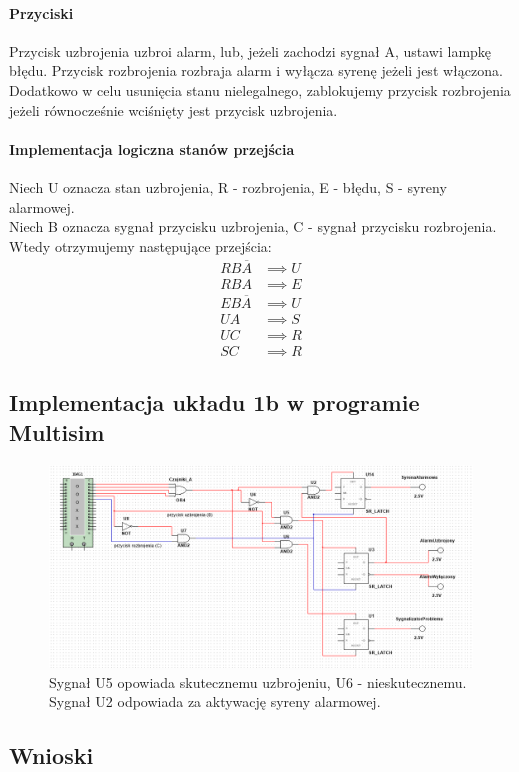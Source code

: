 \documentclass{article}
\begin{document}
\paragraph{Przyciski}
Przycisk uzbrojenia uzbroi alarm, lub, jeżeli zachodzi sygnał A, ustawi lampkę błędu.
Przycisk rozbrojenia rozbraja alarm i wyłącza syrenę jeżeli jest włączona.
Dodatkowo w celu usunięcia stanu nielegalnego, zablokujemy przycisk rozbrojenia jeżeli równocześnie wciśnięty jest przycisk uzbrojenia.
\paragraph{Implementacja logiczna stanów przejścia}
Niech U oznacza stan uzbrojenia, R - rozbrojenia, E - błędu, S - syreny alarmowej. \\
Niech B oznacza sygnał przycisku uzbrojenia, C - sygnał przycisku rozbrojenia. \\
Wtedy otrzymujemy następujące przejścia:
\begin{align*}
RB\overline{A} &\implies U \\
RBA &\implies E \\
EB\overline{A} &\implies U \\
UA &\implies S \\
UC &\implies R \\
SC &\implies R
\end{align*}
\subsection{Implementacja układu 1b w programie Multisim}
\begin{figure}[h!]
\includegraphics[width=\textwidth]{1b}
\caption{Sygnał U5 opowiada skutecznemu uzbrojeniu, U6 - nieskutecznemu. Sygnał U2 odpowiada za aktywację syreny alarmowej.}
\end{figure}
\subsection{Wnioski}
\end{document}

